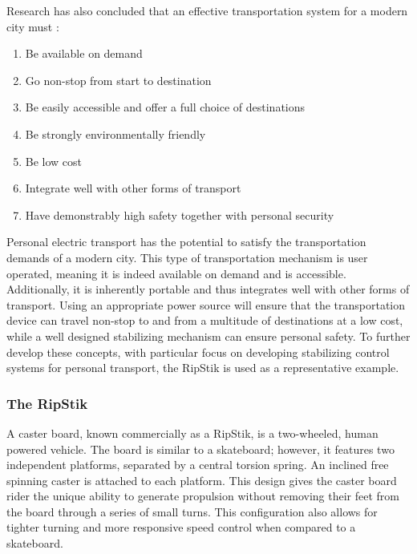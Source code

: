 Research has also concluded that an effective transportation system for a modern city must \cite{SustainableTransport}:

\begin{enumerate}
	\item Be available on demand
	\item Go non-stop from start to destination
	\item Be easily accessible and offer a full choice of destinations
	\item Be strongly environmentally friendly
	\item Be low cost
	\item Integrate well with other forms of transport
	\item Have demonstrably high safety together with personal security
\end{enumerate}

Personal electric transport has the potential to satisfy the transportation demands of a modern city. 
This type of transportation mechanism is user operated, meaning it is indeed available on demand and is accessible. 
Additionally, it is inherently portable and thus integrates well with other forms of transport. 
Using an appropriate power source will ensure that the transportation device can travel non-stop to and from a multitude of destinations at a low cost, while a well designed stabilizing mechanism can ensure personal safety. 
To further develop these concepts, with particular focus on developing stabilizing control systems for personal transport, the RipStik is used as a representative example.

\subsubsection{The RipStik}

A caster board, known commercially as a RipStik, is a two-wheeled, human powered vehicle. 
The board is similar to a skateboard; however, it features two independent platforms, separated by a central torsion spring.
An inclined free spinning caster is attached to each platform. 
This design gives the caster board rider the unique ability to generate propulsion without removing their feet from the board through a series of small turns. 
This configuration also allows for tighter turning and more responsive speed control when compared to a skateboard. 

